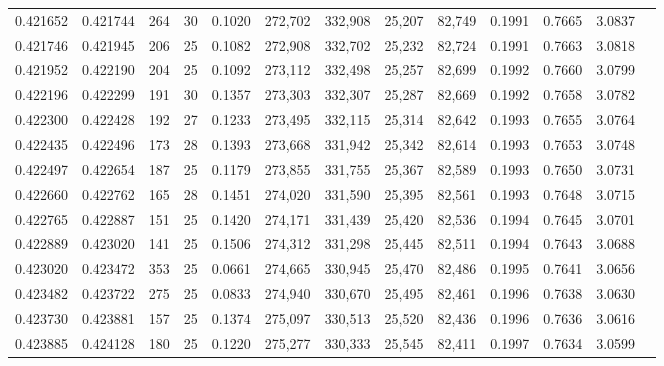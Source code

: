 \begin{tabular}{rrrrrrrrrrrrr}
0.421652 & 0.421744 &   264 &  30 &                                     0.1020 & 272,702 & 332,908 &  25,207 &  82,749 & 0.1991 & 0.7665 & 3.0837 \\
0.421746 & 0.421945 &   206 &  25 &                                     0.1082 & 272,908 & 332,702 &  25,232 &  82,724 & 0.1991 & 0.7663 & 3.0818 \\
0.421952 & 0.422190 &   204 &  25 &                                     0.1092 & 273,112 & 332,498 &  25,257 &  82,699 & 0.1992 & 0.7660 & 3.0799 \\
0.422196 & 0.422299 &   191 &  30 &                                     0.1357 & 273,303 & 332,307 &  25,287 &  82,669 & 0.1992 & 0.7658 & 3.0782 \\
0.422300 & 0.422428 &   192 &  27 &                                     0.1233 & 273,495 & 332,115 &  25,314 &  82,642 & 0.1993 & 0.7655 & 3.0764 \\
0.422435 & 0.422496 &   173 &  28 &                                     0.1393 & 273,668 & 331,942 &  25,342 &  82,614 & 0.1993 & 0.7653 & 3.0748 \\
0.422497 & 0.422654 &   187 &  25 &                                     0.1179 & 273,855 & 331,755 &  25,367 &  82,589 & 0.1993 & 0.7650 & 3.0731 \\
0.422660 & 0.422762 &   165 &  28 &                                     0.1451 & 274,020 & 331,590 &  25,395 &  82,561 & 0.1993 & 0.7648 & 3.0715 \\
0.422765 & 0.422887 &   151 &  25 &                                     0.1420 & 274,171 & 331,439 &  25,420 &  82,536 & 0.1994 & 0.7645 & 3.0701 \\
0.422889 & 0.423020 &   141 &  25 &                                     0.1506 & 274,312 & 331,298 &  25,445 &  82,511 & 0.1994 & 0.7643 & 3.0688 \\
0.423020 & 0.423472 &   353 &  25 &                                     0.0661 & 274,665 & 330,945 &  25,470 &  82,486 & 0.1995 & 0.7641 & 3.0656 \\
0.423482 & 0.423722 &   275 &  25 &                                     0.0833 & 274,940 & 330,670 &  25,495 &  82,461 & 0.1996 & 0.7638 & 3.0630 \\
0.423730 & 0.423881 &   157 &  25 &                                     0.1374 & 275,097 & 330,513 &  25,520 &  82,436 & 0.1996 & 0.7636 & 3.0616 \\
0.423885 & 0.424128 &   180 &  25 &                                     0.1220 & 275,277 & 330,333 &  25,545 &  82,411 & 0.1997 & 0.7634 & 3.0599 \\

\end{tabular}
